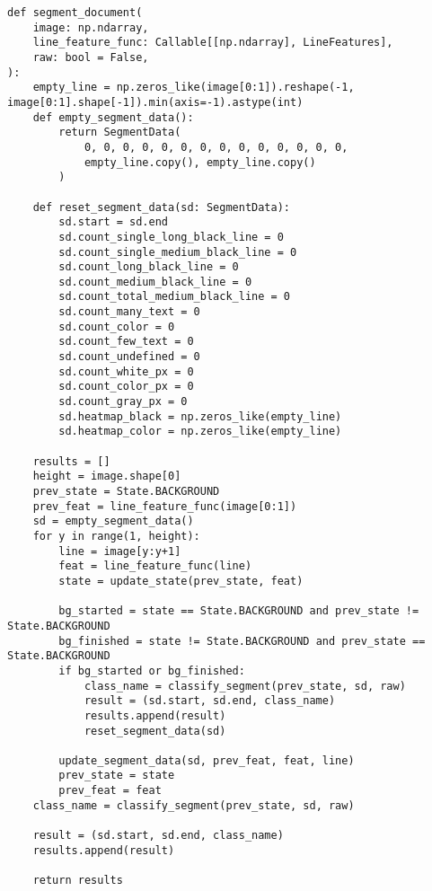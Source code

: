\begin{lstlisting}[caption={Функция для создания первичной или уточненной разметки}, label={lsf:sd}]
def segment_document(
    image: np.ndarray,
    line_feature_func: Callable[[np.ndarray], LineFeatures],
    raw: bool = False,
):
    empty_line = np.zeros_like(image[0:1]).reshape(-1, image[0:1].shape[-1]).min(axis=-1).astype(int)
    def empty_segment_data():
        return SegmentData(
            0, 0, 0, 0, 0, 0, 0, 0, 0, 0, 0, 0, 0, 0,
            empty_line.copy(), empty_line.copy()
        )

    def reset_segment_data(sd: SegmentData):
        sd.start = sd.end
        sd.count_single_long_black_line = 0
        sd.count_single_medium_black_line = 0
        sd.count_long_black_line = 0
        sd.count_medium_black_line = 0
        sd.count_total_medium_black_line = 0
        sd.count_many_text = 0
        sd.count_color = 0
        sd.count_few_text = 0
        sd.count_undefined = 0
        sd.count_white_px = 0
        sd.count_color_px = 0
        sd.count_gray_px = 0
        sd.heatmap_black = np.zeros_like(empty_line)
        sd.heatmap_color = np.zeros_like(empty_line)

    results = []
    height = image.shape[0]
    prev_state = State.BACKGROUND
    prev_feat = line_feature_func(image[0:1])
    sd = empty_segment_data()
    for y in range(1, height):
        line = image[y:y+1]
        feat = line_feature_func(line)
        state = update_state(prev_state, feat)

        bg_started = state == State.BACKGROUND and prev_state != State.BACKGROUND
        bg_finished = state != State.BACKGROUND and prev_state == State.BACKGROUND
        if bg_started or bg_finished:
            class_name = classify_segment(prev_state, sd, raw)
            result = (sd.start, sd.end, class_name)
            results.append(result)
            reset_segment_data(sd)

        update_segment_data(sd, prev_feat, feat, line)
        prev_state = state
        prev_feat = feat
    class_name = classify_segment(prev_state, sd, raw)

    result = (sd.start, sd.end, class_name)
    results.append(result)

    return results
\end{lstlisting}

